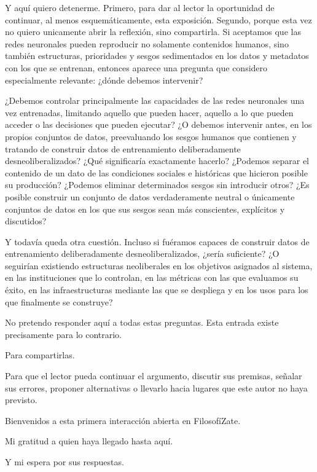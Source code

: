 \documentclass[12pt,a4paper]{article}
\begin{document}
Y aquí quiero detenerme. Primero, para dar al lector la oportunidad de continuar, al menos esquemáticamente, esta exposición. Segundo, porque esta vez no quiero unicamente abrir la reflexión, sino compartirla. Si aceptamos que las redes neuronales pueden reproducir no solamente contenidos humanos, sino también estructuras, prioridades y sesgos sedimentados en los datos y metadatos con los que se entrenan, entonces aparece una pregunta que considero especialmente relevante: ¿dónde debemos intervenir?

¿Debemos controlar principalmente las capacidades de las redes neuronales una vez entrenadas, limitando aquello que pueden hacer, aquello a lo que pueden acceder o las decisiones que pueden ejecutar? ¿O debemos intervenir antes, en los propios conjuntos de datos, preevaluando los sesgos humanos que contienen y tratando de construir datos de entrenamiento deliberadamente desneoliberalizados? ¿Qué significaría exactamente hacerlo? ¿Podemos separar el contenido de un dato de las condiciones sociales e históricas que hicieron posible su producción? ¿Podemos eliminar determinados sesgos sin introducir otros? ¿Es posible construir un conjunto de datos verdaderamente neutral o únicamente conjuntos de datos en los que sus sesgos sean más conscientes, explícitos y discutidos?

Y todavía queda otra cuestión. Incluso si fuéramos capaces de construir datos de entrenamiento deliberadamente desneoliberalizados, ¿sería suficiente? ¿O seguirían existiendo estructuras neoliberales en los objetivos asignados al sistema, en las instituciones que lo controlan, en las métricas con las que evaluamos su éxito, en las infraestructuras mediante las que se despliega y en los usos para los que finalmente se construye?

No pretendo responder aquí a todas estas preguntas. Esta entrada existe precisamente para lo contrario.

Para compartirlas.

Para que el lector pueda continuar el argumento, discutir sus premisas, señalar sus errores, proponer alternativas o llevarlo hacia lugares que este autor no haya previsto.

Bienvenidos a esta primera interacción abierta en FilosofíZate.

Mi gratitud a quien haya llegado hasta aquí.

Y mi espera por sus respuestas.
\end{document}
